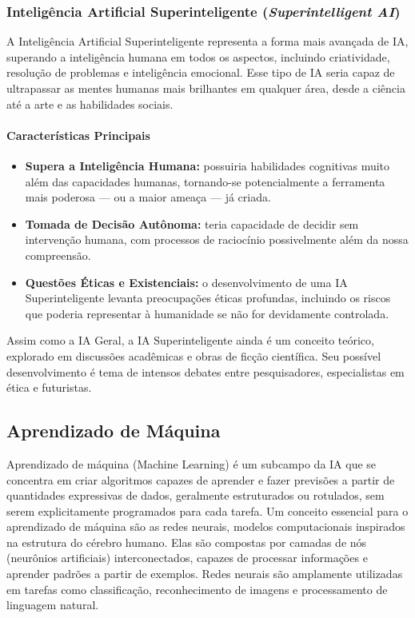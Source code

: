 \subsubsection{Inteligência Artificial Superinteligente (\emph{Superintelligent AI})}

A Inteligência Artificial Superinteligente representa a forma mais avançada de IA, superando a inteligência humana em todos os aspectos, incluindo criatividade, resolução de problemas e inteligência emocional. Esse tipo de IA seria capaz de ultrapassar as mentes humanas mais brilhantes em qualquer área, desde a ciência até a arte e as habilidades sociais.

\paragraph{Características Principais}
\begin{itemize}
    \item \textbf{Supera a Inteligência Humana:} possuiria habilidades cognitivas muito além das capacidades humanas, tornando-se potencialmente a ferramenta mais poderosa — ou a maior ameaça — já criada.
    \item \textbf{Tomada de Decisão Autônoma:} teria capacidade de decidir sem intervenção humana, com processos de raciocínio possivelmente além da nossa compreensão.
    \item \textbf{Questões Éticas e Existenciais:} o desenvolvimento de uma IA Superinteligente levanta preocupações éticas profundas, incluindo os riscos que poderia representar à humanidade se não for devidamente controlada.
\end{itemize}

Assim como a IA Geral, a IA Superinteligente ainda é um conceito teórico, explorado em discussões acadêmicas e obras de ficção científica. Seu possível desenvolvimento é tema de intensos debates entre pesquisadores, especialistas em ética e futuristas.

\subsection{Aprendizado de Máquina}

Aprendizado de máquina (Machine Learning) é um subcampo da IA que se concentra em criar algoritmos capazes de aprender e fazer previsões a partir de quantidades expressivas de dados, geralmente estruturados ou rotulados, sem serem explicitamente programados para cada tarefa. Um conceito essencial para o aprendizado de máquina são as redes neurais, modelos computacionais inspirados na estrutura do cérebro humano. Elas são compostas por camadas de nós (neurônios artificiais) interconectados, capazes de processar informações e aprender padrões a partir de exemplos. Redes neurais são amplamente utilizadas em tarefas como classificação, reconhecimento de imagens e processamento de linguagem natural.

